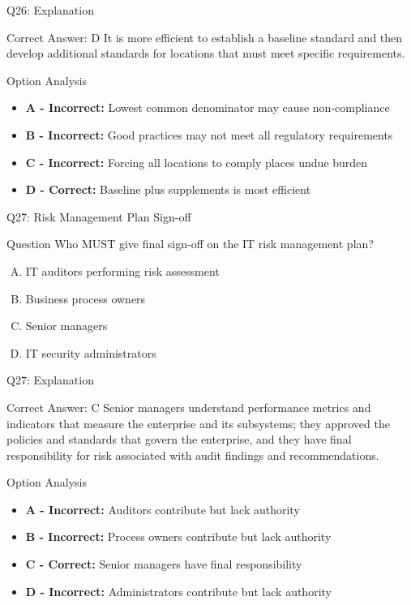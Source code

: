 \documentclass{beamer}
\begin{document}
	\begin{frame}{Q26: Explanation}
		\begin{block}{Correct Answer: D}
			It is more efficient to establish a baseline standard and then develop additional standards for locations that must meet specific requirements.
		\end{block}
		\begin{block}{Option Analysis}
			\begin{itemize}
				\item \textbf{A - Incorrect:} Lowest common denominator may cause non-compliance
				\item \textbf{B - Incorrect:} Good practices may not meet all regulatory requirements
				\item \textbf{C - Incorrect:} Forcing all locations to comply places undue burden
				\item \textbf{D - Correct:} Baseline plus supplements is most efficient
			\end{itemize}
		\end{block}
	\end{frame}
	
	\begin{frame}{Q27: Risk Management Plan Sign-off}
		\begin{block}{Question}
			Who MUST give final sign-off on the IT risk management plan?
		\end{block}
		\begin{enumerate}[(A)]
			\item IT auditors performing risk assessment
			\item Business process owners
			\item Senior managers
			\item IT security administrators
		\end{enumerate}
	\end{frame}
	
	\begin{frame}{Q27: Explanation}
		\begin{block}{Correct Answer: C}
			Senior managers understand performance metrics and indicators that measure the enterprise and its subsystems; they approved the policies and standards that govern the enterprise, and they have final responsibility for risk associated with audit findings and recommendations.
		\end{block}
		\begin{block}{Option Analysis}
			\begin{itemize}
				\item \textbf{A - Incorrect:} Auditors contribute but lack authority
				\item \textbf{B - Incorrect:} Process owners contribute but lack authority
				\item \textbf{C - Correct:} Senior managers have final responsibility
				\item \textbf{D - Incorrect:} Administrators contribute but lack authority
			\end{itemize}
		\end{block}
	\end{frame}
	
\end{document}
